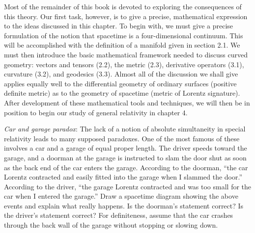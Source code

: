 Most of the remainder of this book is devoted to exploring the consequences of this theory. Our first task, however, is to give a precise, mathematical expression to the ideas discussed in this chapter. To begin with, we must give a precise formulation of the notion that spacetime is a four-dimensional continuum. This will be accomplished with the definition of a manifold given in section 2.1. We must then introduce the basic mathematical framework needed to discuss curved geometry: vectors and tensors (2.2), the metric (2.3), derivative operators (3.1), curvature (3.2), and geodesics (3.3). Almost all of the discussion we shall give applies equally well to the differential geometry of ordinary surfaces (positive definite metric) as to the geometry of spacetime (metric of Lorentz signature). After development of these mathematical tools and techniques, we will then be in position to begin our study of general relativity in chapter 4.

\begin{problem}
    \emph{Car and garage paradox}: The lack of a notion of absolute simultaneity in special relativity leads to many supposed paradoxes. One of the most famous of these involves a car and a garage of equal proper length. The driver speeds toward the garage, and a doorman at the garage is instructed to slam the door shut as soon as the back end of the car enters the garage. According to the doorman, ``the car Lorentz contracted and easily fitted into the garage when I slammed the door.'' According to the driver, ``the garage Lorentz contracted and was too small for the car when I entered the garage.'' Draw a spacetime diagram showing the above events and explain what really happens. Is the doorman's statement correct? Is the driver's statement correct? For definiteness, assume that the car crashes through the back wall of the garage without stopping or slowing down.
\end{problem}

